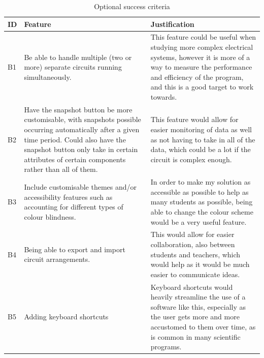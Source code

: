 \documentclass[11pt]{article}
\begin{document}
            \begin{table}[!ht]
                \centering
                \footnotesize
                \begin{tabular}{|l|m{200pt}|m{200pt}|}
                    \hline
                    ID & Feature & Justification \\ \hline
                    B1 & Be able to handle multiple (two or more) separate circuits running simultaneously. & This feature could be useful when studying more complex electrical systems, however it is more of a way to measure the performance and efficiency of the program, and this is a good target to work towards. \\ \hline
                    B2 & Have the snapshot button be more customisable, with snapshots possible occurring automatically after a given time period. Could also have the snapshot button only take in certain attributes of certain components rather than all of them. & This feature would allow for easier monitoring of data as well as not having to take in all of the data, which could be a lot if the circuit is complex enough. \\ \hline
                    B3 & Include customisable themes and/or accessibility features such as accounting for different types of colour blindness. & In order to make my solution as accessible as possible to help as many students as possible, being able to change the colour scheme would be a very useful feature. \\ \hline
                    B4 & Being able to export and import circuit arrangements. & This would allow for easier collaboration, also between students and teachers, which would help as it would be much easier to communicate ideas. \\ \hline
                    B5 & Adding keyboard shortcuts & Keyboard shortcuts would heavily streamline the use of a software like this, especially as the user gets more and more accustomed to them over time, as is common in many scientific programs. \\ \hline
                \end{tabular}
                \caption{Optional success criteria}
                \label{tbl:optional_succ_crit}
            \end{table}
        
        
\end{document}
